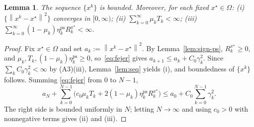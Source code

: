 \documentclass[]{interact}
\theoremstyle{plain}
\newtheorem{lemma}[theorem]{Lemma}
\theoremstyle{definition}
\theoremstyle{remark}
\newcommand{\norm}[1]{\left\lVert #1 \right\rVert}
\newcommand{\ps}{\mathrm{ps}}
\begin{document}
\begin{lemma}\label{lem:bounded}
The sequence $\{x^k\}$ is bounded. Moreover, for each fixed $x^\star\in\Omega$:
\textup{(i)} $\{\norm{x^k-x^\star}^2\}$ converges in $[0,\infty)$;
\textup{(ii)} $\sum_{k=0}^\infty\mu_k T_k<\infty$;
\textup{(iii)} $\sum_{k=0}^\infty(1-\mu_k)\eta^{\ps}_k R^{x^\star}_k<\infty$.
\end{lemma}
\begin{proof}
Fix $x^\star\in\Omega$ and set $a_k:=\norm{x^k-x^\star}^2$. By Lemma~\ref{lem:sign-ps},
$R^{x^\star}_k\ge0$, and $\mu_k,T_k,(1-\mu_k)\eta^{\ps}_k\ge0$, so~\eqref{eq:fejer} gives
$a_{k+1}\le a_k+C_0\gamma_k^2$. Since $\sum_k C_0\gamma_k^2<\infty$ by (A3)(iii),
Lemma~\ref{lem:seq} yields (i), and boundedness of $\{x^k\}$ follows. Summing
\eqref{eq:fejer} from $0$ to $N-1$,
\[
a_N+\sum_{k=0}^{N-1}\bigl(c_0\mu_k T_k+2(1-\mu_k)\eta^{\ps}_k R^{x^\star}_k\bigr)\le a_0+C_0\sum_{k=0}^{N-1}\gamma_k^2 .
\]
The right side is bounded uniformly in $N$; letting $N\to\infty$ and using $c_0>0$ with
nonnegative terms gives (ii) and (iii).
\end{proof}
\end{document}
